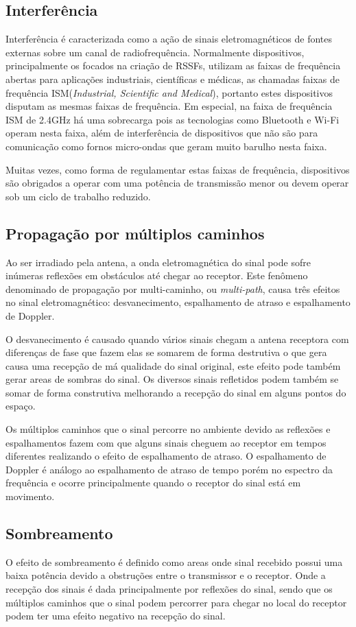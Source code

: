 \subsection*{Interferência}
Interferência é caracterizada como a ação de sinais eletromagnéticos de fontes externas sobre um canal de radiofrequência. Normalmente dispositivos, principalmente os focados na criação de RSSFs, utilizam as faixas de frequência abertas para aplicações industriais, científicas e médicas, as chamadas faixas de frequência ISM(\emph{Industrial, Scientific and Medical}), portanto estes dispositivos disputam as mesmas faixas de frequência. Em especial, na faixa de frequência ISM de 2.4GHz há uma sobrecarga pois as tecnologias como Bluetooth e Wi-Fi operam nesta faixa, além de interferência de dispositivos que não são para comunicação como fornos micro-ondas que geram muito barulho nesta faixa.

Muitas vezes, como forma de regulamentar estas faixas de frequência, dispositivos são obrigados a operar com uma potência de transmissão menor ou devem operar sob um ciclo de trabalho reduzido.

\subsection*{Propagação por múltiplos caminhos}
Ao ser irradiado pela antena, a onda eletromagnética do sinal pode sofre inúmeras reflexões em obstáculos até chegar ao receptor. Este fenômeno denominado de propagação por multi-caminho, ou \emph{multi-path}, causa três efeitos no sinal eletromagnético: desvanecimento, espalhamento de atraso e espalhamento de Doppler.

O desvanecimento é causado quando vários sinais chegam a antena receptora com diferenças de fase que fazem elas se somarem de forma destrutiva o que gera causa uma recepção de má qualidade do sinal original, este efeito pode também gerar areas de sombras do sinal. Os diversos sinais refletidos podem também se somar de forma construtiva melhorando a recepção do sinal em alguns pontos do espaço.

Os múltiplos caminhos que o sinal percorre no ambiente devido as reflexões e espalhamentos fazem com que alguns sinais cheguem ao receptor em tempos diferentes realizando o efeito de espalhamento de atraso. O espalhamento de Doppler é análogo ao espalhamento de atraso de tempo porém no espectro da frequência e ocorre principalmente quando o receptor do sinal está em movimento.


\subsection*{Sombreamento}
O efeito de sombreamento é definido como areas onde sinal recebido possui uma baixa potência devido a obstruções entre o transmissor e o receptor. Onde a recepção dos sinais é dada principalmente por reflexões do sinal, sendo que os múltiplos caminhos que o sinal podem percorrer para chegar no local do receptor podem ter uma efeito negativo na recepção do sinal.


